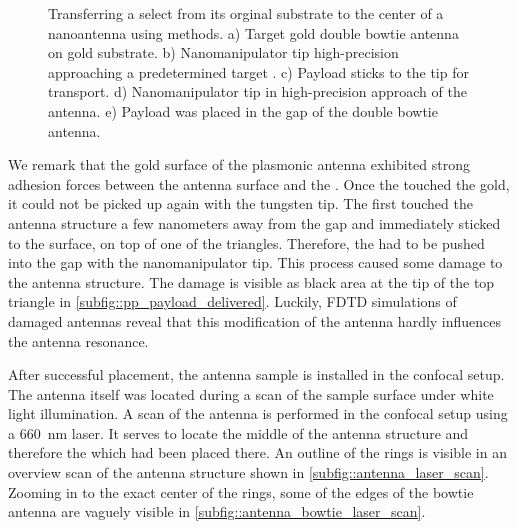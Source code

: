 \begin{figure}[htp]
\begin{subfigure}[t]{ 0.49\linewidth}
					\caption{}
					\label{subfig::pp_payload_delivered}
				\end{subfigure}
				\caption[Pick-and-place coupling of \nd to antenna]{Transferring a select \nd from its orginal substrate to the center of a nanoantenna using \pp methods. a) Target gold double bowtie antenna on gold substrate. b) Nanomanipulator tip high-precision approaching a predetermined target \nd. c) Payload \nd sticks to the tip for transport. d) Nanomanipulator tip in high-precision approach of the antenna. e) Payload \nd was placed in the gap of the double bowtie antenna.}
				\label{fig::pp_antenna}
			\end{figure}

			We remark that the gold surface of the plasmonic antenna exhibited strong adhesion forces between the antenna surface and the \nd.
			Once the \nd touched the gold, it could not be picked up again with the tungsten tip.
			The \nd first touched the antenna structure a few nanometers away from the gap and immediately sticked to the surface, on top of one of the triangles.
			Therefore, the \nd had to be pushed into the gap with the nanomanipulator tip.
			This process caused some damage to the antenna structure.
			The damage is visible as black area at the tip of the top triangle in \autoref{subfig::pp_payload_delivered}.
			Luckily, FDTD simulations of damaged antennas reveal that this modification of the antenna hardly influences the antenna resonance.

			After successful placement, the antenna sample is installed in the confocal setup.
			The antenna itself was located during a scan of the sample surface under white light illumination.
			A scan of the antenna is performed in the confocal setup using a \SI{660}{nm} \cw laser.
			It serves to locate the middle of the antenna structure and therefore the \nd which had been placed there.
			An outline of the rings is visible in an overview scan of the antenna structure shown in \autoref{subfig::antenna_laser_scan}.
			Zooming in to the exact center of the rings, some of the edges of the bowtie antenna are vaguely visible in \autoref{subfig::antenna_bowtie_laser_scan}.

